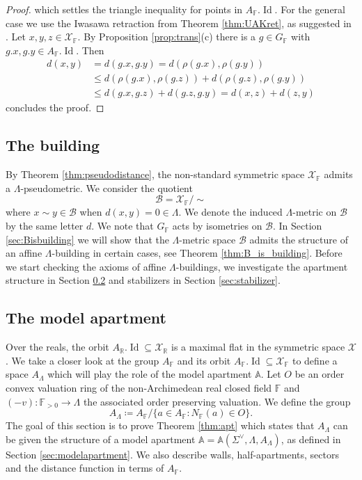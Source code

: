 \documentclass[12pt]{amsart}
\newcommand{\F}{\mathbb{F} }
\newcommand{\R}{\mathbb{R} }
\newcommand{\X}{\mathcal{X}}
\newcommand{\A}{\mathbb{A}}
\newcommand{\B}{\mathcal{B}}
\numberwithin{equation}{section}
\theoremstyle{remark} %
\begin{document}
\begin{proof}
	which settles the triangle inequality for points in $ A_\F.\operatorname{Id}$. For the general case we use the Iwasawa retraction from Theorem \ref{thm:UAKret}, as suggested in \cite[Lemma 1.2]{KrTe}. Let $x,y,z \in \X_\F$. By Proposition \ref{prop:trans}(c) there is a $g\in G_\F$ with $g.x ,g.y \in A_\F.\operatorname{Id}$. Then
	\begin{align*}
		d(x,y) & = d(g.x,g.y) = d(\rho(g.x),\rho(g.y)) \\
		& \leq d(\rho(g.x),\rho(g.z)) + d (\rho(g.z),\rho(g.y)) \\
		&\leq d(g.x,g.z) + d(g.z,g.y) = d(x,z) + d(z,y) 
	\end{align*}
	concludes the proof.
\end{proof}



\subsection{The building} \label{sec:building}

By Theorem \ref{thm:pseudodistance}, the non-standard symmetric space $\X_\F$ admits a $\Lambda$-pseudometric. We consider the quotient
$$
\B = \X_\F/\!\sim
$$
where $x\sim y \in \B$ when $d(x,y) = 0 \in \Lambda$. We denote the induced $\Lambda$-metric on $\B$ by the same letter $d$. We note that $G_\F$ acts by isometries on $\B$. In Section \ref{sec:Bisbuilding} we will show that the $\Lambda$-metric space $\B$ admits the structure of an affine $\Lambda$-building in certain cases, see Theorem \ref{thm:B_is_building}.
Before we start checking the axioms of affine $\Lambda$-buildings, we investigate the apartment structure in Section \ref{sec:Xapartment} and stabilizers in Section \ref{sec:stabilizer}.




\subsection{The model apartment}\label{sec:Xapartment}

Over the reals, the orbit $A_\R.\operatorname{Id} \subseteq \X_\R$ is a maximal flat in the symmetric space $\X$. We take a closer look at the group $A_\F$ and its orbit $A_\F.\operatorname{Id} \subseteq \X_\F$ to define a space $A_\Lambda$ which will play the role of the model apartment $\A$.
Let $O$ be an order convex valuation ring of the non-Archimedean real closed field $\F$ and $(-v) \colon \F_{>0} \to \Lambda$ the associated order preserving valuation. %
We define the group
$$
A_{\Lambda} \coloneqq A_{\F}/\{ a \in A_{\F} \colon N_{\F}(a) \in O \}.
$$
The goal of this section is to prove Theorem \ref{thm:apt} which states that $A_{\Lambda}$ can be given the structure of a model apartment $\A = \A(\Sigma^\vee,\Lambda,A_{\Lambda})$, as defined in Section \ref{sec:modelapartment}. We also describe walls, half-apartments, sectors and the distance function in terms of $A_\F$. 
\end{document}
